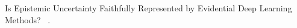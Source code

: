 Is Epistemic Uncertainty Faithfully Represented by Evidential Deep Learning Methods? ~\parencite{Jurgens.}.